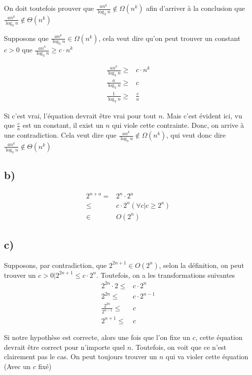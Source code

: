 \documentclass[10pt,a4paper]{article}
\begin{document}
On doit toutefois prouver que $\frac{an^k}{\log_3 n} \notin \Omega(n^k)$ afin d'arriver à la conclusion que $\frac{an^k}{\log_3 n} \notin \Theta(n^k)$ 

Supposons que $\frac{an^k}{\log_3 n} \in \Omega(n^k)$, cela veut dire qu'on peut trouver un constant $c > 0$ que $\frac{an^k}{\log_3 n} \geq c \cdot n^k$

\begin{align*}
    \frac{an^k}{\log_3 n} \geq& c \cdot n^k \\
    \frac{a}{\log_3 n} \geq& c \\
    \frac{1}{\log_3 n} \geq& \frac{c}{a}
\end{align*}

Si c'est vrai, l'équation devrait être vrai pour tout $n$. Mais c'est évident ici, vu que $\frac{c}{a}$ est un constant, il exist un $n$ qui viole cette contrainte. Donc, on arrive à une contradiction. Cela veut dire que $\frac{an^k}{\log_3 n} \notin \Omega(n^k)$, qui veut donc dire $\frac{an^k}{\log_3 n} \notin \Theta(n^k)$ 

\subsection{b)}

\begin{align*}
    2^{n+a} =& 2^n \cdot 2^a \\
    \leq&  c \cdot 2^n (\forall c | c \geq 2^a) \\
    \in& O(2^n)
\end{align*}

\subsection{c)}
Supposons, par contradiction, que $2^{2n+1} \in O(2^n)$, selon la définition, on peut trouver un $c > 0 | 2^{2n+1} \leq c \cdot 2^n$. Toutefois, on a les transformations suivantes
\begin{align*}
    2^{2n} \cdot 2 \leq& c \cdot 2^n \\
    2^{2n} \leq& c \cdot 2^{n-1} \\
    \frac{2^{2n}}{2^{n-1}} \leq& c \\
    2^{n+1} \leq& c 
\end{align*}

Si notre hypothèse est correcte, alors une fois que l'on fixe un $c$, cette équation devrait être correct pour n'importe quel $n$. Toutefois, on voit que ce n'est clairement pas le cas. On peut toujours trouver un $n$ qui va violer cette équation (Avec un $c$ fixé)
\end{document}
